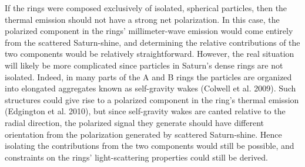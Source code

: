 If the rings were composed exclusively of isolated, spherical particles, then the thermal emission should not have a strong net polarization. In this case, the polarized component in the rings' millimeter-wave emission would come entirely from the scattered Saturn-shine, and determining the relative contributions of the two components would be relatively straightforward. However, the real situation will likely be more complicated since particles in Saturn's dense rings are not isolated. Indeed, in many parts of the A and B rings the particles are organized into elongated aggregates known as self-gravity wakes (Colwell et al. 2009). Such structures could give rise to a polarized component in the ring's thermal emission (Edgington et al. 2010), but since self-gravity wakes are canted relative to the radial direction, the polarized signal they generate should have different orientation from the polarization generated by scattered Saturn-shine. Hence isolating the contributions from the two components would still be possible, and constraints on the rings' light-scattering properties could still be derived.



